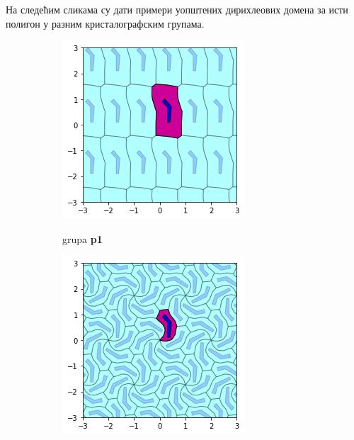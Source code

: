 \documentclass[12pt]{report}
\begin{document}
\begin{samepage}
 На следећим сликама су дати примери уопштених дирихлеових домена за исти полигон у разним кристалографским групама.
 \begin{figure}[H]

  \begin{subfigure}[b]{0.3\textwidth}
    \includegraphics[width=\textwidth]{output_21_1.png}
    \label{fig:f20}
    \caption{grupa \textbf{p1}}
  \end{subfigure}
  \begin{subfigure}[b]{0.3\textwidth}
    \includegraphics[width=\textwidth]{output_21_2.png}

\end{subfigure}
\end{figure}
\end{samepage}
\end{document}

